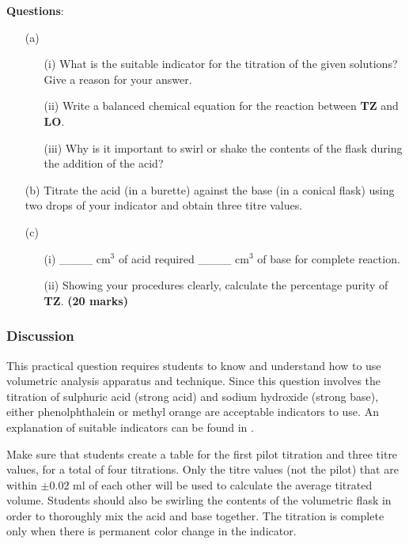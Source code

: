 \textbf{Questions}:\\
\begin{enumerate}
\item[(a)]
\begin{enumerate}
\item[(i)] What is the suitable indicator for the titration of the given solutions?\\
Give a reason for your answer.
\item[(ii)] Write a balanced chemical equation for the reaction between \textbf{TZ} and \textbf{LO}.
\item[(iii)] Why is it important to swirl or shake the contents of the flask during the addition of the acid?\\
\end{enumerate}

\item[(b)] Titrate the acid (in a burette) against the base (in a conical flask) using two drops of your indicator and obtain three titre values.\\

\item[(c)] 
\begin{enumerate}
\item[(i)] \_\_\_\_ cm$^3$ of acid required \_\_\_\_ cm$^3$ of base for complete reaction.
\item[(ii)] Showing your procedures clearly, calculate the percentage purity of \textbf{TZ}. \hfill \textbf{(20 marks)}
\end{enumerate}
\end{enumerate}


\subsubsection{Discussion}
This practical question requires students to know and understand how to use volumetric analysis apparatus and technique. Since this question involves the titration of sulphuric acid (strong acid) and sodium hydroxide (strong base), either phenolphthalein or methyl orange are acceptable indicators to use. An explanation of suitable indicators can be found in .

Make sure that students create a table for the first pilot titration and three titre values, for a total of four titrations. Only the titre values (not the pilot) that are within $\pm$0.02 ml of each other will be used to calculate the average titrated volume. Students should also be swirling the contents of the volumetric flask in order to thoroughly mix the acid and base together. The titration is complete only when there is permanent color change in the indicator.

